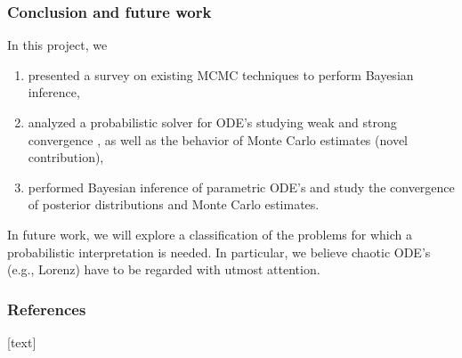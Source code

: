 \documentclass{beamer}
\begin{document}
\begin{frame}
	\frametitle{Conclusion and future work}
	
	In this project, we 
	\begin{enumerate}
		\item presented a survey on existing MCMC techniques to perform Bayesian inference,
		\item analyzed a probabilistic solver for ODE's studying weak and strong convergence \cite{CGS16}, as well as the behavior of Monte Carlo estimates (novel contribution),
		\item performed Bayesian inference of parametric ODE's and study the convergence of posterior distributions and Monte Carlo estimates.
	\end{enumerate}
	In future work, we will explore a classification of the problems for which a probabilistic interpretation is needed. In particular, we believe chaotic ODE's (e.g., Lorenz) have to be regarded with utmost attention.
\end{frame}

\appendix
\begin{frame}[allowframebreaks]
	\frametitle{References}
	
	[text]
	
	
\end{frame}
\end{document}
